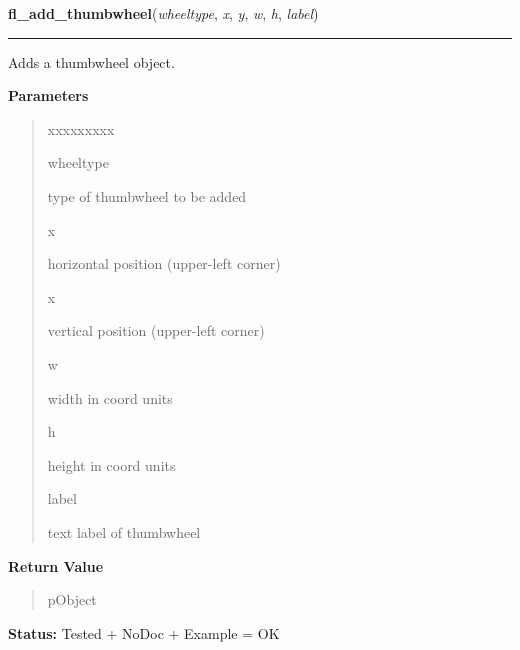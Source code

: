 \hspace{.8\funcindent}\begin{boxedminipage}{\funcwidth}

    \raggedright \textbf{fl\_add\_thumbwheel}(\textit{wheeltype}, \textit{x}, \textit{y}, \textit{w}, \textit{h}, \textit{label})

    \vspace{-1.5ex}

    \rule{\textwidth}{0.5\fboxrule}
\setlength{\parskip}{2ex}
    Adds a thumbwheel object.

\setlength{\parskip}{1ex}
      \textbf{Parameters}
      \vspace{-1ex}

      \begin{quote}
        \begin{Ventry}{xxxxxxxxx}

          \item[wheeltype]

          type of thumbwheel to be added

          \item[x]

          horizontal position (upper-left corner)

          \item[x]

          vertical position (upper-left corner)

          \item[w]

          width in coord units

          \item[h]

          height in coord units

          \item[label]

          text label of thumbwheel

        \end{Ventry}

      \end{quote}

      \textbf{Return Value}
    \vspace{-1ex}

      \begin{quote}
      pObject

      \end{quote}

\textbf{Status:} Tested + NoDoc + Example = OK



    \end{boxedminipage}

